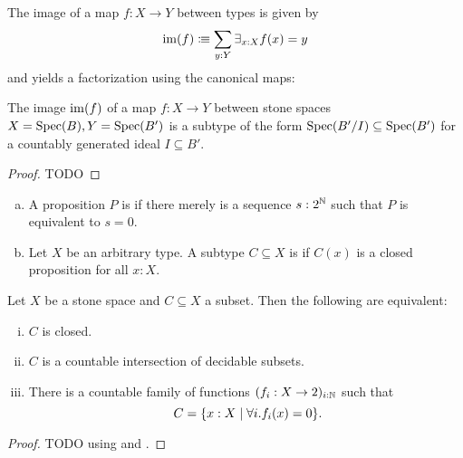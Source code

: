 \begin{definition}
  The image of a map $f:X\to Y$ between types is given by
  \[
  \operatorname{im}(f) \vcentcolon\mspace{-1.2mu}\equiv \sum_{y:Y} \exists_{x:X}f(x)=y
  \]
  and yields a factorization using the canonical maps:
  \begin{center}
  \end{center}
\end{definition}

\begin{proposition}
  \label{stone-image}
  The image $\operatorname{im}(f)$ of a map $f:X\to Y$ between stone spaces $X=\operatorname{Spec}(B),Y=\operatorname{Spec}(B')$ is a subtype of the form $\operatorname{Spec}(B'/I)\subseteq \operatorname{Spec}(B')$ for a countably generated ideal $I\subseteq B'$.  
\end{proposition}

\begin{proof}
  TODO
\end{proof}

\begin{definition}
  \begin{enumerate}[(a)]
  \item A proposition $P$ is  if there merely is a sequence $s:2^{\mathbb{N}}$ such that $P$ is equivalent to $s=0$.
  \item Let $X$ be an arbitrary type.
    A subtype $C\subseteq X$ is  if $C(x)$ is a closed proposition for all $x:X$.
  \end{enumerate}
\end{definition}

\begin{proposition}\label{propClosedAlternativeDefinitions}
  Let $X$ be a stone space and $C\subseteq X$ a subset.
  Then the following are equivalent:
  \begin{enumerate}[(i)]
  \item $C$ is closed.
  \item $C$ is a countable intersection of decidable subsets.
  \item There is a countable family of functions $(f_i:X\to 2)_{i:\mathbb{N}}$ such that
    \[
    C=\{ x:X \mid \forall i. f_i(x)=0 \}
    \rlap{.}
    \]
  \end{enumerate}
\end{proposition}

\begin{proof}
  TODO using  and .
\end{proof}
